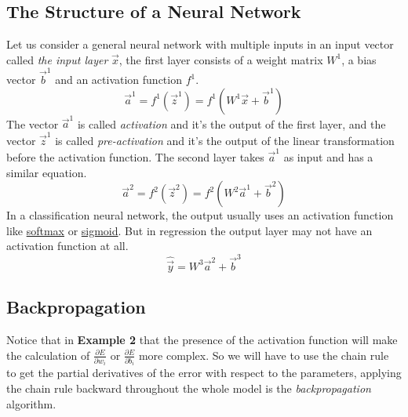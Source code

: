\documentclass[a4paper]{article}
\theoremstyle{definition}
\begin{document}
\subsection{The Structure of a Neural Network}
Let us consider a general neural network with multiple inputs in an input vector called \textit{the input layer} $\vec{x}$, the first layer consists of a weight matrix $W^1$, a bias vector $\vec{b}^1$ and an activation function $f^1$.
\begin{equation*}
    \vec{a}^1 = f^1(\vec{z}^1) = f^1 \left(W^1 \vec{x} + \vec{b}^1\right)
\end{equation*}
The vector $\vec{a}^1$ is called \textit{activation} and it's the output of the first layer, and the vector $\vec{z}^1$ is called \textit{pre-activation} and it's the output of the linear transformation before the activation function.
The second layer takes $\vec{a}^1$ as input and has a similar equation.
\begin{equation*}
    \vec{a}^2 = f^2(\vec{z}^2) = f^2 \left(W^2 \vec{a}^1 + \vec{b}^2\right)
\end{equation*}
In a classification neural network, the output usually uses an activation function like \href{https://en.wikipedia.org/wiki/Softmax_function}{softmax} or \href{https://en.wikipedia.org/wiki/Sigmoid_function}{sigmoid}.
But in regression the output layer may not have an activation function at all.
\begin{equation*}
    \hat{\vec{y}} = W^3 \vec{a}^2 + \vec{b}^3
\end{equation*}

\subsection{Backpropagation}

Notice that in \textbf{Example 2} that the presence of the activation function will make the calculation of $\frac{\partial E}{\partial w_i}$ or $\frac{\partial E}{\partial b_i}$ more complex.
So we will have to use the chain rule to get the partial derivatives of the error with respect to the parameters, applying the chain rule backward throughout the whole model is the \textit{backpropagation} algorithm.
\end{document}
